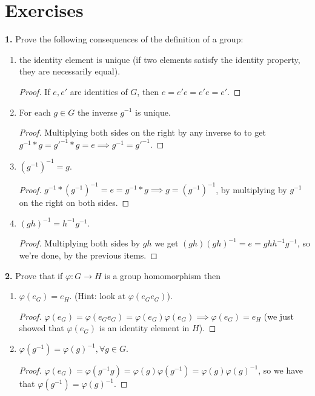 \documentclass{book}
\theoremstyle{definition}
\begin{document}
\section{Exercises}
\noindent \textbf{1.} Prove the following consequences of the definition of a group:
\begin{enumerate}
	\item the identity element is unique (if two elements satisfy the identity property, they are
	necessarily equal).
	
	\begin{proof}
		If $e,e'$ are identities of $G$, then $e = e'e = e'e = e'$. 
	\end{proof}
	
	\item For each $g \in G$ the inverse $g^{-1}$ is unique.
	
	\begin{proof}
		Multiplying both sides on the right by any inverse to to get $g^{-1}*g = g'^{-1}*g = e \implies g^{-1} = g'^{-1}$.
	\end{proof}
	
	\item $(g^{-1})^{-1} = g$.
	
	\begin{proof}
		$g^{-1}* (g^{-1})^{-1} = e = g^{-1}*g \implies g=(g^{-1})^{-1}$, by multiplying by $g^{-1}$ on the right on both sides. 
	\end{proof}
	
	\item $(gh)^{-1} = h^{-1}g^{-1}$.
	
	\begin{proof}
		Multiplying both sides by $gh$ we get $(gh)(gh)^{-1} = e = ghh^{-1}g^{-1}$, so we're done, by the previous items.
	\end{proof}


\end{enumerate}


\noindent \textbf{2.} Prove that if $\varphi : G \to H$ is a group homomorphism then 
\begin{enumerate}
	\item $\varphi(e_G) = e_H$. (Hint: look at $\varphi(e_G e_G)$).
	
	\begin{proof}
		$\varphi(e_G) = \varphi(e_G e_G) = \varphi(e_G)\varphi(e_G) \implies \varphi(e_G) =e_H$ (we just showed that $\varphi(e_G)$ is an identity element in $H$). 
	\end{proof}
	
	\item $\varphi(g^{-1}) = \varphi(g)^{-1}, \forall g\in G$.
	\begin{proof}
		$\varphi(e_G) = \varphi(g^{-1}g)= \varphi(g)\varphi(g^{-1}) = \varphi(g)\varphi(g)^{-1}$, so we have that $\varphi(g^{-1}) = \varphi(g)^{-1}$.
	\end{proof}
\end{enumerate}
\end{document}
